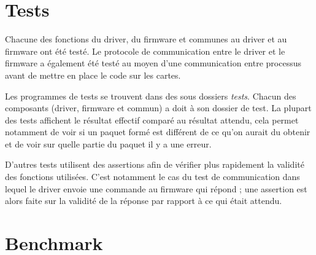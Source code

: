 \section{Tests}

Chacune des fonctions du driver, du firmware et communes au driver et au
firmware ont été testé. Le protocole de communication entre le driver et le
firmware a également été testé au moyen d'une communication entre processus
avant de mettre en place le code sur les cartes.

Les programmes de tests se trouvent dans des sous dossiers \emph{tests}.
Chacun des composants (driver, firmware et commun) a doit à son dossier de
test. La plupart des tests affichent le résultat effectif comparé au résultat
attendu, cela permet notamment de voir si un paquet formé est différent de ce
qu'on aurait du obtenir et de voir sur quelle partie du paquet il y a une
erreur.

D'autres tests utilisent des assertions afin de vérifier plus rapidement la
validité des fonctions utilisées. C'est notamment le cas du test de
communication dans lequel le driver envoie une commande au firmware qui
répond ; une assertion est alors faite sur la validité de la réponse par
rapport à ce qui était attendu.

\section{Benchmark}

